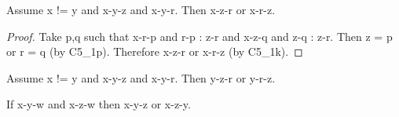 \documentclass{article}
\begin{document}
\begin{forthel}
    \begin{lemma}[D5_1]
      Assume x != y and x-y-z and x-y-r. Then x-z-r or x-r-z.
    \end{lemma}
    \begin{proof}
    	Take p,q such that x-r-p and r-p : z-r and x-z-q and z-q : z-r.
    	Then z = p or r = q (by C5_1p). Therefore x-z-r or x-r-z (by C5_1k).
    \end{proof}

    \begin{lemma}[D5_2]
      Assume x != y and x-y-z and x-y-r. Then y-z-r or y-r-z.
    \end{lemma}

    \begin{theorem}[D5_3]
      If x-y-w and x-z-w then x-y-z or x-z-y.
    \end{theorem}
  \end{forthel}
\end{document}

